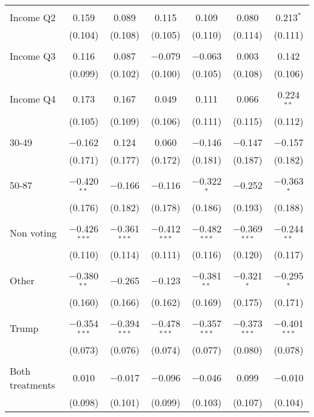 \begin{tabular}{@{\extracolsep{5pt}}lcccccc}
  & & & & & & \\ 
 Income Q2 & 0.159 & 0.089 & 0.115 & 0.109 & 0.080 & 0.213$^{*}$ \\ 
  & (0.104) & (0.108) & (0.105) & (0.110) & (0.114) & (0.111) \\ 
  & & & & & & \\ 
 Income Q3 & 0.116 & 0.087 & $-$0.079 & $-$0.063 & 0.003 & 0.142 \\ 
  & (0.099) & (0.102) & (0.100) & (0.105) & (0.108) & (0.106) \\ 
  & & & & & & \\ 
 Income Q4 & 0.173 & 0.167 & 0.049 & 0.111 & 0.066 & 0.224$^{**}$ \\ 
  & (0.105) & (0.109) & (0.106) & (0.111) & (0.115) & (0.112) \\ 
  & & & & & & \\ 
 30-49 & $-$0.162 & 0.124 & 0.060 & $-$0.146 & $-$0.147 & $-$0.157 \\ 
  & (0.171) & (0.177) & (0.172) & (0.181) & (0.187) & (0.182) \\ 
  & & & & & & \\ 
 50-87 & $-$0.420$^{**}$ & $-$0.166 & $-$0.116 & $-$0.322$^{*}$ & $-$0.252 & $-$0.363$^{*}$ \\ 
  & (0.176) & (0.182) & (0.178) & (0.186) & (0.193) & (0.188) \\ 
  & & & & & & \\ 
 Non voting & $-$0.426$^{***}$ & $-$0.361$^{***}$ & $-$0.412$^{***}$ & $-$0.482$^{***}$ & $-$0.369$^{***}$ & $-$0.244$^{**}$ \\ 
  & (0.110) & (0.114) & (0.111) & (0.116) & (0.120) & (0.117) \\ 
  & & & & & & \\ 
 Other & $-$0.380$^{**}$ & $-$0.265 & $-$0.123 & $-$0.381$^{**}$ & $-$0.321$^{*}$ & $-$0.295$^{*}$ \\ 
  & (0.160) & (0.166) & (0.162) & (0.169) & (0.175) & (0.171) \\ 
  & & & & & & \\ 
 Trump & $-$0.354$^{***}$ & $-$0.394$^{***}$ & $-$0.478$^{***}$ & $-$0.357$^{***}$ & $-$0.373$^{***}$ & $-$0.401$^{***}$ \\ 
  & (0.073) & (0.076) & (0.074) & (0.077) & (0.080) & (0.078) \\ 
  & & & & & & \\ 
 Both treatments & 0.010 & $-$0.017 & $-$0.096 & $-$0.046 & 0.099 & $-$0.010 \\ 
  & (0.098) & (0.101) & (0.099) & (0.103) & (0.107) & (0.104) \\ 

\end{tabular}
